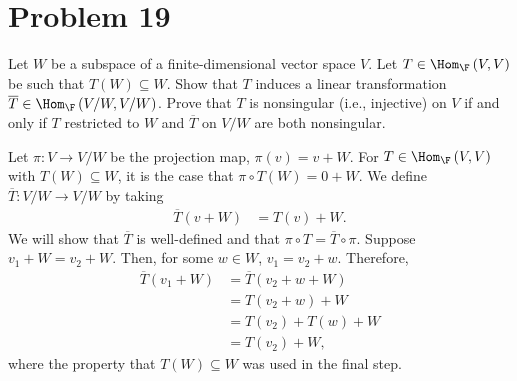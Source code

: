 \documentclass[12pt]{mypackage}
\begin{document}
\section{Problem 19}%
\begin{problem}
  Let $W$ be a subspace of a finite-dimensional vector space $V$. Let $T\in \Hom_{\F}\left(V,V\right)$ be such that $T\left(W\right)\subseteq W$. Show that $T$ induces a linear transformation $\overline{T}\in \Hom_{\F}\left(V/W,V/W\right)$. Prove that $T$ is nonsingular (i.e., injective) on $V$ if and only if $T$ restricted to $W$ and $\overline{T}$ on $V/W$ are both nonsingular.
\end{problem}
\begin{solution}
  Let $\pi: V\rightarrow V/W$ be the projection map, $\pi(v) = v + W$. For $T\in \Hom_{\F}\left(V,V\right)$ with $T(W) \subseteq W$, it is the case that $\pi\circ T (W) = 0 + W$. We define $\overline{T}: V/W \rightarrow V/W$ by taking
  \begin{align*}
    \overline{T}\left(v + W\right) &= T(v) + W.
  \end{align*}
  We will show that $\overline{T}$ is well-defined and that $\pi \circ T = \overline{T}\circ \pi$. Suppose $v_1 + W = v_2 + W$. Then, for some $w\in W$, $v_1 = v_2 + w$. Therefore,
  \begin{align*}
    \overline{T}\left(v_1 + W\right) &= \overline{T}\left(v_2 + w + W\right)\\
                                     &= T\left(v_2 + w\right) + W\\
                                     &= T\left(v_2\right) + T\left(w\right) + W\\
                                     &= T\left(v_2\right) + W,
  \end{align*}
  where the property that $T\left(W\right)\subseteq W$ was used in the final step.\newline


\end{solution}
\end{document}
